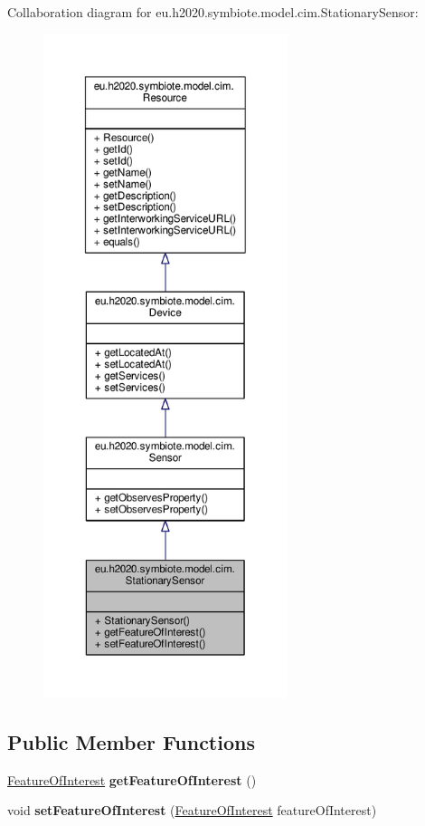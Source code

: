 Collaboration diagram for eu.\+h2020.\+symbiote.\+model.\+cim.\+Stationary\+Sensor\+:\nopagebreak
\begin{figure}[H]
\begin{center}
\leavevmode
\includegraphics[height=550pt]{classeu_1_1h2020_1_1symbiote_1_1model_1_1cim_1_1StationarySensor__coll__graph}
\end{center}
\end{figure}
\subsection*{Public Member Functions}
\begin{DoxyCompactItemize}
\item 
\mbox{\label{classeu_1_1h2020_1_1symbiote_1_1model_1_1cim_1_1StationarySensor_a34cdddb44487e475bf7e8e0b303fddc0}} 
\hyperlink{classeu_1_1h2020_1_1symbiote_1_1model_1_1cim_1_1FeatureOfInterest}{Feature\+Of\+Interest} {\bfseries get\+Feature\+Of\+Interest} ()
\item 
\mbox{\label{classeu_1_1h2020_1_1symbiote_1_1model_1_1cim_1_1StationarySensor_ae0df134d7af18cd1e2d97da3ea3c2470}} 
void {\bfseries set\+Feature\+Of\+Interest} (\hyperlink{classeu_1_1h2020_1_1symbiote_1_1model_1_1cim_1_1FeatureOfInterest}{Feature\+Of\+Interest} feature\+Of\+Interest)
\end{DoxyCompactItemize}


